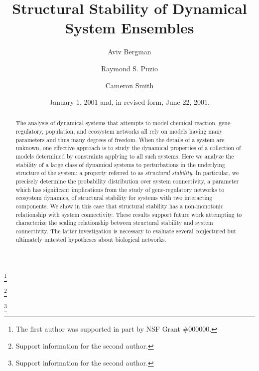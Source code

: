 \documentclass{amsart}
\theoremstyle{definition}
\theoremstyle{remark}
\numberwithin{equation}{section}
\begin{document}
\title{Structural Stability of Dynamical System Ensembles}

\author{Aviv Bergman}
\address{Department of Systems and Computational Biology, Albert Einstein College of Medicine, Bronx, New York 10461}
\curraddr{}
\thanks{The first author was supported in part by NSF Grant \#000000.}

\author{Raymond S. Puzio}
\address{Department of Systems and Computational Biology, Albert Einstein College of Medicine, Bronx, New York 10461}
\curraddr{}
\thanks{Support information for the second author.}

\author{Cameron Smith}
\address{Department of Systems and Computational Biology, Albert Einstein College of Medicine, Bronx, New York 10461}
\curraddr{}
\thanks{Support information for the second author.}


\date{January 1, 2001 and, in revised form, June 22, 2001.}



\begin{abstract}
The analysis of dynamical systems that attempts to model chemical reaction, gene-regulatory, population, and ecosystem networks all rely on models having many parameters and thus many degrees of freedom. When the details of a system are unknown, one effective approach is to study the dynamical properties of a collection of models determined by constraints applying to all such systems. Here we analyze the stability of a large class of dynamical systems to perturbations in the underlying structure of the system: a property referred to as \emph{structural stability}. In particular, we precisely determine the probability distribution over system connectivity, a parameter which has significant implications from the study of gene-regulatory networks to ecosystem dynamics, of structural stability for systems with two interacting components. We show in this case that structural stability has a non-monotonic relationship with system connectivity. These results support future work attempting to characterize the scaling relationship between structural stability and system connectivity. The latter investigation is necessary to evaluate several conjectured but ultimately untested hypotheses about biological networks.
\end{abstract}
\end{document}
